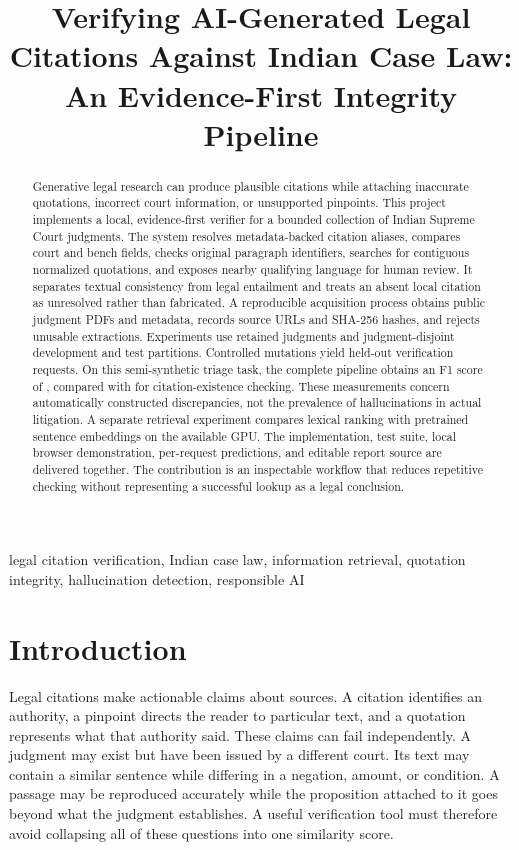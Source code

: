 \documentclass[conference]{IEEEtran}
\title{Verifying AI-Generated Legal Citations Against Indian Case Law: An Evidence-First Integrity Pipeline}
\author{\IEEEauthorblockN{Afjal Hussein, Ayush Kumar, Arush Sharma}
\IEEEauthorblockA{S24BCAU0171, S24BCAU0103, S24BCAU0161\\
Department of Computer Science Engineering \& Technology\\Bennett University, India\\
CSET485---AI and Society, Phase 2\\Team ID: not supplied in the source material}}
\begin{document}
\maketitle

\begin{abstract}
Generative legal research can produce plausible citations while attaching inaccurate quotations, incorrect court information, or unsupported pinpoints. This project implements a local, evidence-first verifier for a bounded collection of Indian Supreme Court judgments. The system resolves metadata-backed citation aliases, compares court and bench fields, checks original paragraph identifiers, searches for contiguous normalized quotations, and exposes nearby qualifying language for human review. It separates textual consistency from legal entailment and treats an absent local citation as unresolved rather than fabricated. A reproducible acquisition process obtains public judgment PDFs and metadata, records source URLs and SHA-256 hashes, and rejects unusable extractions. Experiments use \CorpusCount{} retained judgments and judgment-disjoint development and test partitions. Controlled mutations yield \TestCount{} held-out verification requests. On this semi-synthetic triage task, the complete pipeline obtains an F1 score of \FullFone{}, compared with \ExistFone{} for citation-existence checking. These measurements concern automatically constructed discrepancies, not the prevalence of hallucinations in actual litigation. A separate retrieval experiment compares lexical ranking with pretrained sentence embeddings on the available GPU. The implementation, test suite, local browser demonstration, per-request predictions, and editable report source are delivered together. The contribution is an inspectable workflow that reduces repetitive checking without representing a successful lookup as a legal conclusion.
\end{abstract}
\begin{IEEEkeywords}
legal citation verification, Indian case law, information retrieval, quotation integrity, hallucination detection, responsible AI
\end{IEEEkeywords}

\section{Introduction}
Legal citations make actionable claims about sources. A citation identifies an authority, a pinpoint directs the reader to particular text, and a quotation represents what that authority said. These claims can fail independently. A judgment may exist but have been issued by a different court. Its text may contain a similar sentence while differing in a negation, amount, or condition. A passage may be reproduced accurately while the proposition attached to it goes beyond what the judgment establishes. A useful verification tool must therefore avoid collapsing all of these questions into one similarity score.
\end{document}

